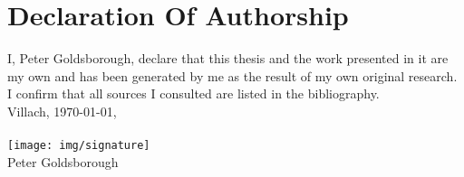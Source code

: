 \chapter*{Declaration Of Authorship}

I, Peter Goldsborough, declare that this thesis and the work presented in it are my own and has been generated by me as the result of my own original research. I confirm that all sources I consulted are listed in the bibliography. \\

\noindent Villach, \today, \\ \\

\noindent \texttt{[image: img/signature]} \\

Peter Goldsborough
